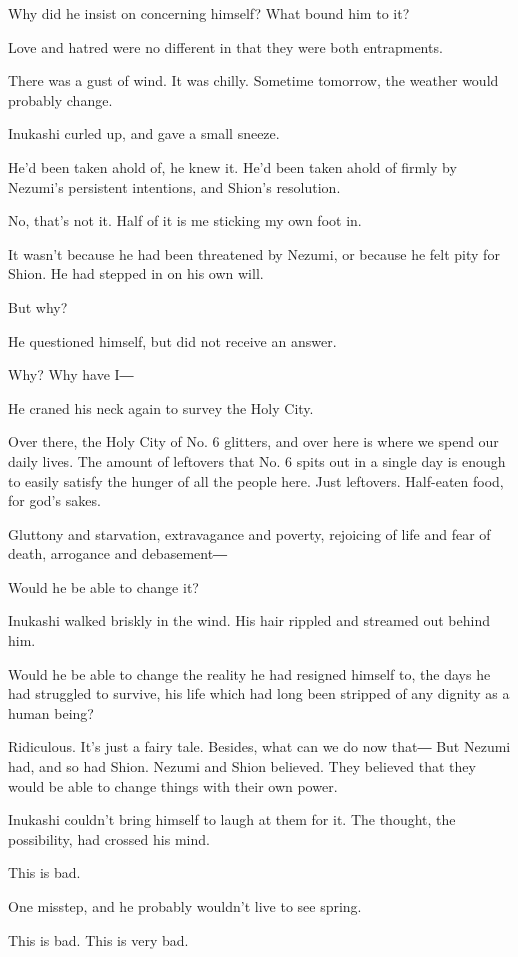Why did he insist on concerning himself? What bound him to it?

Love and hatred were no different in that they were both entrapments.

There was a gust of wind. It was chilly. Sometime tomorrow, the weather
would probably change.

Inukashi curled up, and gave a small sneeze.

He'd been taken ahold of, he knew it. He'd been taken ahold of firmly by
Nezumi's persistent intentions, and Shion's resolution.

No, that's not it. Half of it is me sticking my own foot in.

It wasn't because he had been threatened by Nezumi, or because he felt
pity for Shion. He had stepped in on his own will.

But why?

He questioned himself, but did not receive an answer.

Why? Why have I―

He craned his neck again to survey the Holy City.

Over there, the Holy City of No. 6 glitters, and over here is where we
spend our daily lives. The amount of leftovers that No. 6 spits out in a
single day is enough to easily satisfy the hunger of all the people
here. Just leftovers. Half-eaten food, for god's sakes.

Gluttony and starvation, extravagance and poverty, rejoicing of life and
fear of death, arrogance and debasement―

Would he be able to change it?

Inukashi walked briskly in the wind. His hair rippled and streamed out
behind him.

Would he be able to change the reality he had resigned himself to, the
days he had struggled to survive, his life which had long been stripped
of any dignity as a human being?

Ridiculous. It's just a fairy tale. Besides, what can we do now that―
But Nezumi had, and so had Shion. Nezumi and Shion believed. They
believed that they would be able to change things with their own power.

Inukashi couldn't bring himself to laugh at them for it. The thought,
the possibility, had crossed his mind.

This is bad.

One misstep, and he probably wouldn't live to see spring.

This is bad. This is very bad.

